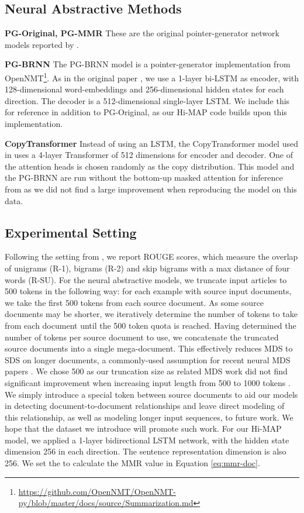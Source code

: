 \documentclass[11pt,a4paper]{article}
\begin{document}
\subsection{Neural Abstractive Methods}
\textbf{PG-Original, PG-MMR} These are the original pointer-generator network models reported by \cite{lebanoff18mds}.

\noindent\textbf{PG-BRNN} The PG-BRNN model is a pointer-generator implementation from OpenNMT\footnote{\url{https://github.com/OpenNMT/OpenNMT-py/blob/master/docs/source/Summarization.md}}. As in the original paper \cite{see2017ptr_gen}, we use a 1-layer bi-LSTM as encoder, with 128-dimensional word-embeddings and 256-dimensional hidden states for each direction. The decoder is a 512-dimensional single-layer LSTM. We include this for reference in addition to PG-Original, as our Hi-MAP code builds upon this implementation. 

\noindent\textbf{CopyTransformer} Instead of using an LSTM, the CopyTransformer model used in  uses a 4-layer Transformer of 512 dimensions for encoder and decoder.  One of the attention heads is chosen randomly as the copy distribution. This model and the PG-BRNN are run without the bottom-up masked attention for inference from  as we did not find a large improvement when reproducing the model on this data. 

\subsection{Experimental Setting}

Following the setting from \cite{lebanoff18mds}, we report ROUGE \cite{lin2004rouge} scores, which measure the overlap of unigrams (R-1), bigrams (R-2) and skip bigrams with a max distance of four words (R-SU).  For the neural abstractive models, we truncate input articles to 500 tokens in the following way: for each example with  source input documents, we take the first 500 tokens from each source document.  As some source documents may be shorter, we iteratively determine the number of tokens to take from each document until the 500 token quota is reached. Having determined the number of tokens per source document to use, we concatenate the truncated source documents into a single mega-document. This effectively reduces MDS to SDS on longer documents, a commonly-used assumption for recent neural MDS papers \cite{17classification,liu18wikisum,lebanoff18mds}. We chose 500 as our truncation size as related MDS work did not find significant improvement when increasing input length from 500 to 1000 tokens \cite{liu18wikisum}. We simply introduce a special token between source documents to aid our models in detecting document-to-document relationships and leave direct modeling of this relationship, as well as modeling longer input sequences, to future work. We hope that the dataset we introduce will promote such work. For our Hi-MAP model, we applied a 1-layer bidirectional LSTM network, with the hidden state dimension 256 in each direction. The sentence representation dimension is also 256. We set the  to calculate the MMR value in Equation \ref{eq:mmr-doc}.
\end{document}
